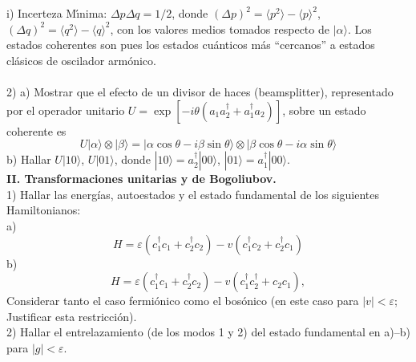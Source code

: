 \documentclass[12pt]{article}
\begin{document}
i) Incerteza M\'{\i}nima: $\Delta p\Delta q=1/2$, 
donde $(\Delta p)^2=\langle p^2\rangle-\langle p\rangle^2$, 
$(\Delta q)^2=\langle q^2\rangle-\langle q\rangle^2$, 
con los valores medios tomados respecto 
de $|\alpha\rangle$. 
Los estados coherentes 
son pues los estados cu\'anticos m\'as ``cercanos'' a estados 
cl\'asicos de oscilador arm\'onico. \\ \\
2) a) Mostrar que el efecto de un divisor de haces (beamsplitter), representado por el operador  
unitario 
$U=\exp[-i\theta(a_1a^\dagger_2+a^\dagger_1a_2)]$, sobre un estado coherente es 
\[U|\alpha\rangle\otimes|\beta\rangle=|\alpha\cos\theta -i\beta\sin\theta\rangle
\otimes|\beta\cos\theta-i\alpha\sin\theta\rangle\]
b) Hallar $U|10\rangle$, $U|01\rangle$, donde $|10\rangle=a^\dagger_2|00\rangle$, 
$|01\rangle=a^\dagger_1|00\rangle$. \\\hfill\break
 \hfill\break
 {\bf II.  Transformaciones unitarias y de Bogoliubov.}  \\
1) Hallar las energ\'ias, autoestados y el  estado fundamental de los siguientes Hamiltonianos:\\
a) %
\[H=\varepsilon(c^\dagger_1 c_1+c^\dagger_2 c_2)-v(c^\dagger_1 c_2+c^\dagger_2 c_1)\]
b) %
\[H=\varepsilon(c^\dagger_1 c_1+c^\dagger_2 c_2)-v(c^\dagger_1 c^\dagger_2+c_2 c_1),
\]
Considerar tanto el caso fermi\'onico como el bos\'onico (en este caso para $|v|<\varepsilon$; Justificar esta restricci\'on).  
\\
2) Hallar el entrelazamiento (de los modos 1 y 2) del estado fundamental en a)--b) para $|g|<\varepsilon$. 
\end{document}
